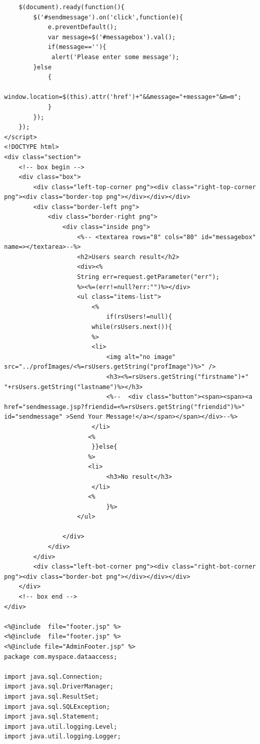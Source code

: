 \documentclass[a4paper,12pt]{article}
\begin{document}
\begin{verbatim}
    $(document).ready(function(){
        $('#sendmessage').on('click',function(e){
            e.preventDefault();
            var message=$('#messagebox').val();
            if(message==''){
             alert('Please enter some message');
        }else
            {
                window.location=$(this).attr('href')+"&&message="+message+"&m=m";
            }
        });
    });
</script>
<!DOCTYPE html>
<div class="section">
    <!-- box begin -->
    <div class="box">
        <div class="left-top-corner png"><div class="right-top-corner png"><div class="border-top png"></div></div></div>
        <div class="border-left png">
            <div class="border-right png">
                <div class="inside png">
                    <%-- <textarea rows="8" cols="80" id="messagebox" name=></textarea>--%>
                    <h2>Users search result</h2>
                    <div><%
                    String err=request.getParameter("err");
                    %><%=(err!=null?err:"")%></div>
                    <ul class="items-list">
                        <%
                            if(rsUsers!=null){
                        while(rsUsers.next()){
                        %>
                        <li>
                            <img alt="no image" src="../profImages/<%=rsUsers.getString("profImage")%>" />
                            <h3><%=rsUsers.getString("firstname")+" "+rsUsers.getString("lastname")%></h3>
                            <%--  <div class="button"><span><span><a href="sendmessage.jsp?friendid=<%=rsUsers.getString("friendid")%>" id="sendmessage" >Send Your Message!</a></span></span></div>--%>
                        </li>
                       <%
                        }}else{
                       %>
                       <li>
                            <h3>No result</h3>
                        </li>
                       <%
                            }%>
                    </ul>

                </div>
            </div>
        </div>
        <div class="left-bot-corner png"><div class="right-bot-corner png"><div class="border-bot png"></div></div></div>
    </div>
    <!-- box end -->
</div>

<%@include  file="footer.jsp" %>
<%@include  file="footer.jsp" %>
<%@include file="AdminFooter.jsp" %>
package com.myspace.dataaccess;

import java.sql.Connection;
import java.sql.DriverManager;
import java.sql.ResultSet;
import java.sql.SQLException;
import java.sql.Statement;
import java.util.logging.Level;
import java.util.logging.Logger;


\end{verbatim}
\end{document}
